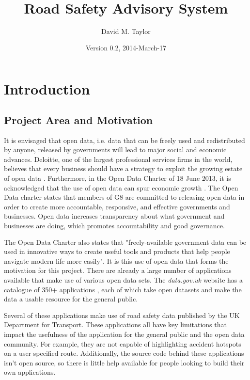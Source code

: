 \documentclass[authoryearcitations]{UoYCSproject}
\author{David M. Taylor}
\title{Road Safety Advisory System}
\date{Version 0.2, 2014-March-17}
\begin{document}
\maketitle
\listoffigures
\listoftables
\renewcommand*{\lstlistlistingname}{List of Listings}
\lstlistoflistings

\cleardoublepage
\label{sec:start}
\thispagestyle{empty}\cleardoublepage

\chapter{Introduction}

\section{Project Area and Motivation}

It is envisaged that open data, i.e. data that can be freely used and redistributed by anyone, released by governments will lead to major social and economic advances. Deloitte, one of the largest professional services firms in the world, believes that every business should have a strategy to exploit the growing estate of open data \citep{DeloitteAnalytics2012}. Furthermore, in the Open Data Charter of 18 June 2013, it is acknowledged that the use of open data can spur economic growth \citep{CabinetOffice2013}. The Open Data charter states that members of G8 are committed to releasing open data in order to create more accountable, responsive, and effective governments and businesses. Open data increases transparency about what government and businesses are doing, which promotes accountability and good governance.

The Open Data Charter also states that "freely-available government data can be used in innovative ways to create useful tools and products that help people navigate modern life more easily". It is this use of open data that forms the motivation for this project. There are already a large number of applications available that make use of various open data sets. The \textit{data.gov.uk} website has a catalogue of 350+ applications \citep{Data.go}, each of which take open datasets and make the data a usable resource for the general public. 

Several of these applications make use of road safety data published by the UK Department for Transport. These applications all have key limitations that impact the usefulness of the application for the general public and the open data community. For example, they are not capable of highlighting accident hotspots on a user specified route. Additionally, the source code behind these applications isn't open source, so there is little help available for people looking to build their own applications.
\end{document}
